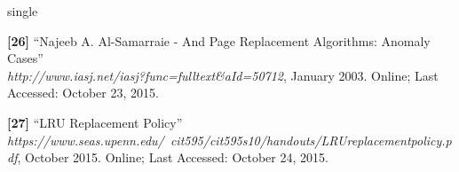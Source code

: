 \documentclass[12pt]{uthesis-v12}  %
\begin{document}
\begin{referencelist}{single}
	\item \textbf{[26]} ``Najeeb A. Al-Samarraie - And Page Replacement Algorithms: Anomaly Cases''
	\\\emph{http://www.iasj.net/iasj?func=fulltext\&aId=50712}, January 2003. 
	Online; Last Accessed: October 23, 2015.
										
	\item \textbf{[27]} ``LRU Replacement Policy''
	\\\emph{https://www.seas.upenn.edu/~cit595/cit595s10/handouts/LRUreplacementpolicy.pdf}, October 2015. 
	Online; Last Accessed: October 24, 2015.
											
\end{referencelist}




%
%
%
%
%
\end{document}
